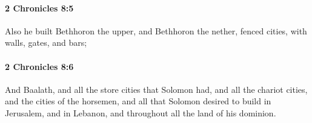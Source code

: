 		\paragraph{2 Chronicles 8:5} %
			\label{2CHRONICLES-8-5}

			Also he built Bethhoron the upper, and Bethhoron the nether, fenced cities, with walls, gates, and bars;


		\paragraph{2 Chronicles 8:6} %
			\label{2CHRONICLES-8-6}

			And Baalath, and all the store cities that Solomon had, and all the chariot cities, and the cities of the horsemen, and all that Solomon desired to build in Jerusalem, and in Lebanon, and throughout all the land of his dominion.


